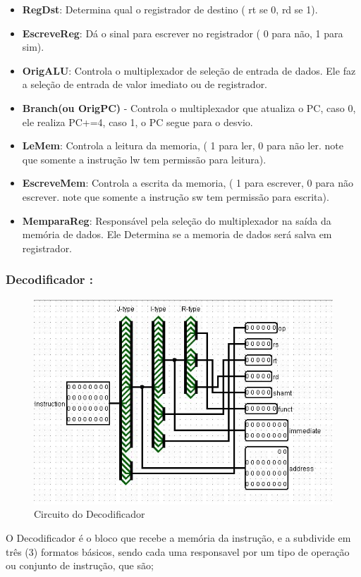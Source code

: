 \documentclass[
	article,
	11pt,
	oneside,
	a4paper,
	english,
	brazil,
	]{abntex2}
\begin{document}
\begin{itemize}
    \item \textbf{RegDst}: Determina qual o registrador de destino ( rt se 0, rd se 1).
    \item \textbf{EscreveReg}: Dá o sinal para escrever no registrador ( 0 para não, 1 para sim).
    \item \textbf{OrigALU}: Controla o multiplexador de seleção de entrada de dados. Ele faz a seleção de entrada de valor imediato ou de registrador.
    \item \textbf{Branch(ou OrigPC)} - Controla o multiplexador que atualiza o PC, caso 0, ele realiza PC+=4, caso 1, o PC segue para o desvio.
    \item \textbf{LeMem}: Controla a leitura da memoria, ( 1 para ler, 0 para não ler. note que somente a instrução lw tem permissão para leitura).
    \item \textbf{EscreveMem}: Controla a escrita da memoria, ( 1 para escrever, 0 para não escrever. note que somente a instrução sw tem permissão para escrita).   
    \item \textbf{MemparaReg}: Responsável pela seleção do multiplexador na saída da memória de dados. Ele Determina se a memoria de dados será salva em registrador.
\end{itemize}
\subsubsection{Decodificador :}

        \begin{figure}[!htb]
        \centering
        \includegraphics[scale=0.7]{imagens/Decodificador.JPG}
        \caption{Circuito do Decodificador}
        \label{fig:hostnetid}
        \end{figure}
O Decodificador é o bloco que recebe a memória da instrução, e a subdivide em três (3) formatos básicos, sendo cada uma responsavel por um tipo de operação ou conjunto de instrução, que são;
\end{document}
